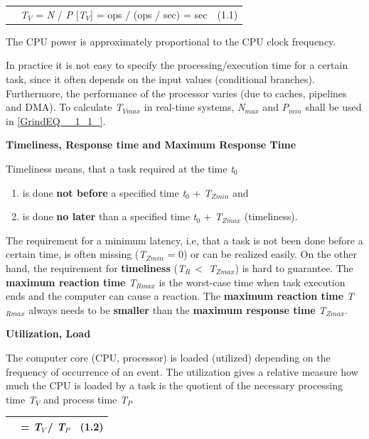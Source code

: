 \begin{tabular}{|p{0.3in}|p{3.9in}|p{0.4in}|} \hline 
 & \textit{T${}_{V}$} = \textit{N} / \textit{P    }[\textit{T${}_{V}$}] = ops / (ops / sec) = sec\newline  & (1.1)
\end{tabular}

The CPU power is approximately proportional to the CPU clock frequency.

In practice it is not easy to specify the processing/execution time for a certain task, since it often depends on the input values (conditional branches). Furthermore, the performance of the processor varies (due to caches, pipelines and DMA). To calculate \textit{T${}_{Vmax}$} in real-time systems, \textit{N${}_{max}$} and \textit{P${}_{min}$} shall be used in \eqref{GrindEQ__1_1_}.

\textbf{Timeliness, Response time and Maximum Response Time}

Timeliness means, that a task required at the time \textit{t}${}_{0}$

\begin{enumerate}
	\item  is done \textbf{not before} a specified time \textit{t}${}_{0}$ + \textit{T${}_{Zmin}$} and
	\item  is done \textbf{no later} than a specified time \textit{t}${}_{0}$ + \textit{T${}_{Zmax}$} (timeliness).
\end{enumerate}

The requirement for a minimum latency, i.e, that a task is not been done before a certain time, is often missing (\textit{T${}_{Zmin}$} = 0) or can be realized easily. On the other hand, the requirement for \textbf{timeliness} (\textit{T${}_{R\ }$}$\mathrm{<}$ \textit{T${}_{Zmax}$}) is hard to guarantee. The \textbf{maximum reaction time} \textit{T${}_{Rmax}$} is the worst-case time when task execution ends and the computer can cause a reaction. The \textbf{maximum reaction time} \textit{T${}_{Rmax}$} always needs to be \textbf{smaller} than the \textbf{maximum response time} \textit{T${}_{Zmax}$}.

\textbf{Utilization, Load}

The computer core (CPU, processor) is loaded (utilized) depending on the frequency of occurrence of an event. The utilization  gives a relative measure how much the CPU is loaded by a task is the quotient of the necessary processing time \textit{T${}_{V}$} and process time \textit{T${}_{P}$}

\begin{tabular}{|p{0.3in}|p{3.9in}|p{0.4in}|} \hline 
 &  = \textit{T}${}_{V\ }$/ \textit{T}${}_{P}$ & (1.2) \\ \hline 
\end{tabular}

